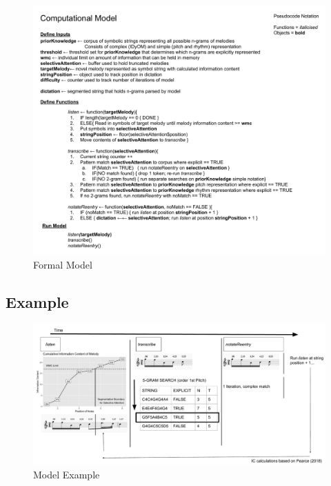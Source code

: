 \documentclass[12pt,]{book}
\begin{document}
\begin{figure}

{\centering \includegraphics[width=1\linewidth]{img/Model} 

}

\caption{Formal Model}\label{fig:mymodel}
\end{figure}

\hypertarget{example}{%
\subsection{Example}\label{example}}

\begin{figure}

{\centering \includegraphics[width=1\linewidth]{img/Model Graphic} 

}

\caption{Model Example}\label{fig:walkthru}
\end{figure}
\end{document}
